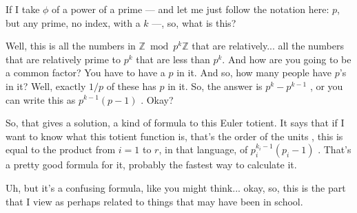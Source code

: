 \begin{content}
\end{content}

\begin{speech}[00:19:16 - 00:20:45]
If I take $\phi$ of a power of a prime  --- and let me just follow the notation here: $p$, but any prime, no index, with a $k$ ---, so, what is this?

Well, this is all the numbers in $\mathbb{Z} \bmod p^k \mathbb{Z}$ that are relatively... all the numbers that are relatively prime to $p^k$ that are less than $p^k$. And how are you going to be a common factor? You have to have a $p$ in it. And so, how many people have $p$'s in it? Well, exactly $1/p$ of these has $p$ in it. So, the answer is $p^k - p^{k-1}$ , or you can write this as $p^{k-1}(p - 1)$ . Okay?

So, that gives a solution, a kind of formula to this Euler totient. It says that if I want to know what this totient function is, that's the order of the units , this is equal to the product from $i = 1$ to $r$, in that language, of $p_i^{k_i - 1}(p_i - 1)$ . That's a pretty good formula for it, probably the fastest way to calculate it.

Uh, but it's a confusing formula, like you might think... okay, so, this is the part that I view as perhaps related to things that may have been in school.
\end{speech}

